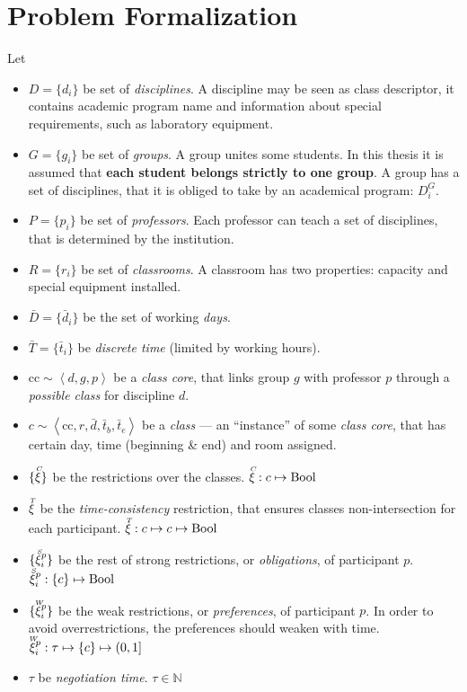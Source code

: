 \documentclass[../ThesisDoc]{subfiles}
\begin{document}
\providecommand{\rootdir}{..}



\section{Problem Formalization}
\label{sec:ProblemFormal}


Let \begin{itemize}
\item $D=\{d_i\}$ be set of \emph{disciplines}.
  A discipline may be seen as class descriptor, it contains
  academic program name and information about special requirements,
  such as laboratory equipment.
\item $G=\{g_i\}$ be set of \emph{groups}.
  A group unites some students. In this thesis it is assumed that
  \textbf{each student belongs strictly to one group}.
  A group has a set of disciplines, that it is obliged to take by an
  academical program: $D^G_i$.
\item $P=\{p_i\}$ be set of \emph{professors}.
  Each professor can teach a set of disciplines, that is determined
  by the institution.
\item $R=\{r_i\}$ be set of \emph{classrooms}.
  A classroom has two properties: capacity and special equipment installed.
\item $\bar D=\{\bar d_i\}$ be the set of working \emph{days}.
\item $\bar T=\{\bar t_i\}$ be \emph{discrete time} (limited by working hours).
\item $\mathrm{cc} \sim \left< d, g, p \right>$ be a \emph{class core}, that
      links group $g$ with professor $p$ through a \emph{possible class} for
      discipline $d$.
\item $ c \sim \left< \mathrm{cc}, r, \bar d, \bar t_b, \bar t_e \right> $
      be a \emph{class} --- an ``instance'' of some \emph{class core}, that has
      certain day, time (beginning \& end) and room assigned.
\item $\{\accentset{C}{\xi}\}$ be the restrictions over the classes.
      $\accentset{C}{\xi} : c \mapsto \mathrm{Bool}$
\item $\accentset{T}{\xi}$ be the \emph{time-consistency} restriction, that ensures
  classes non-intersection for each participant.
      $\accentset{T}{\xi} : c \mapsto c \mapsto \mathrm{Bool}$
\item $\{\accentset{S}{\xi}^p_i\}$ be the rest of strong restrictions, or \emph{obligations},
      of participant $p$.
      $\accentset{S}{\xi}^p_i : \{c\} \mapsto \mathrm{Bool}$
\item $\{\accentset{W}{\xi}^p_i\}$ be the weak restrictions, or \emph{preferences}, of participant $p$.
      In order to avoid overrestrictions, the preferences should weaken with time.
      $\accentset{W}{\xi}^p_i : \tau \mapsto \{c\} \mapsto (0,1]$
\item $\tau$ be \emph{negotiation time}. $\tau \in \mathbb{N}$
\end{itemize}
\end{document}
